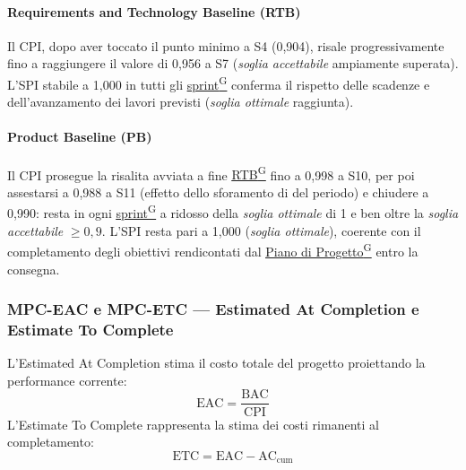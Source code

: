 \documentclass[a4paper,12pt]{article}
\providecommand{\glslink}[2]{\href{https://alittlebyte-19.github.io/Documentazione/glossario.html\#gls-#1}{\underline{#2}\textsuperscript{\scriptsize G}}}
\begin{document}
\paragraph*{Requirements and Technology Baseline (RTB)} Il CPI, dopo aver toccato il punto minimo a S4 (0,904), risale progressivamente fino a raggiungere il valore di 0,956 a S7 (\emph{soglia accettabile} ampiamente superata). L'SPI stabile a 1,000 in tutti gli \glslink{sprint}{sprint} conferma il rispetto delle scadenze e dell'avanzamento dei lavori previsti (\emph{soglia ottimale} raggiunta).

\paragraph*{Product Baseline (PB)} Il CPI prosegue la risalita avviata a fine \glslink{rtb-requirements-and-technology-baseline}{RTB} fino a 0,998 a S10, per poi assestarsi a 0,988 a S11 (effetto dello sforamento di  del periodo) e chiudere a 0,990: resta in ogni \glslink{sprint}{sprint} a ridosso della \emph{soglia ottimale} di 1 e ben oltre la \emph{soglia accettabile} $\geq 0,9$. L'SPI resta pari a 1,000 (\emph{soglia ottimale}), coerente con il completamento degli obiettivi rendicontati dal \glslink{piano-di-progetto}{Piano di Progetto} entro la consegna.

\subsubsection{MPC-EAC e MPC-ETC — Estimated At Completion e Estimate To Complete}

L'Estimated At Completion stima il costo totale del progetto proiettando la performance corrente:
\[
  \text{EAC} = \frac{\text{BAC}}{\text{CPI}}
\]
L'Estimate To Complete rappresenta la stima dei costi rimanenti al completamento:
\[
  \text{ETC} = \text{EAC} - \text{AC}_\text{cum}
\]
\end{document}
